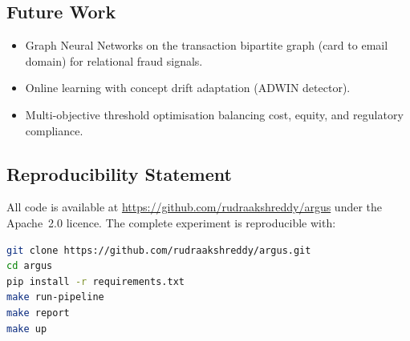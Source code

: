 \subsection{Future Work}

\begin{itemize}
    \item Graph Neural Networks on the transaction bipartite graph
          (card to email domain) for relational fraud signals.
    \item Online learning with concept drift adaptation (ADWIN detector).
    \item Multi-objective threshold optimisation balancing cost, equity,
          and regulatory compliance.
\end{itemize}

\subsection{Reproducibility Statement}

All code is available at \url{https://github.com/rudraakshreddy/argus}
under the Apache~2.0 licence. The complete experiment is reproducible with:
\begin{lstlisting}[language=bash, caption={Full pipeline execution.}]
git clone https://github.com/rudraakshreddy/argus.git
cd argus
pip install -r requirements.txt
make run-pipeline
make report
make up
\end{lstlisting}
